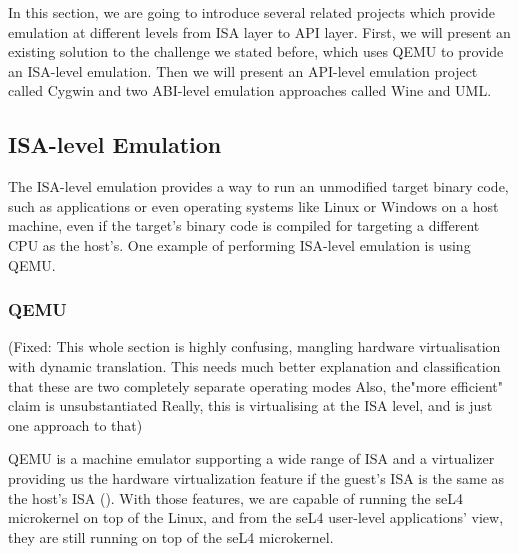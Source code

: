 In this section, we are going to introduce several related projects which provide emulation at different levels from ISA layer to API layer. First, we will present an existing solution to the challenge we stated before, which uses QEMU to provide an ISA-level emulation. Then we will present an API-level emulation project called Cygwin and two ABI-level emulation approaches called Wine and UML. 

\subsection{ISA-level Emulation}

The ISA-level emulation provides a way to run an unmodified target binary code, such as applications or even operating systems like Linux or Windows on a host machine, even if the target's binary code is compiled for targeting a different CPU as the host's. One example of performing ISA-level emulation is using QEMU. 

\subsubsection{QEMU}

(Fixed: This whole section is highly confusing, mangling hardware virtualisation with dynamic translation. This needs much better explanation and classification that these are two completely separate operating modes
Also, the"more efficient" claim is unsubstantiated
Really, this is virtualising at the ISA level, and is just one approach to that)

QEMU is a machine emulator supporting a wide range of ISA and a virtualizer providing us the hardware virtualization feature if the guest's ISA is the same as the host's ISA (\cite{enwikiqemu}). With those features, we are capable of running the seL4 microkernel on top of the Linux, and from the seL4 user-level applications' view, they are still running on top of the seL4 microkernel. 


